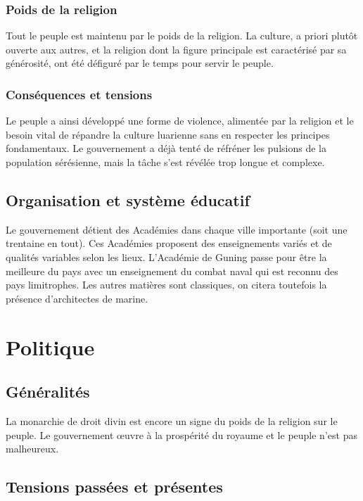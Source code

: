 \documentclass[french, a4paper, 12pt]{article}
\begin{document}
\subsubsection{Poids de la religion}

Tout le peuple est maintenu par le poids de la religion. La culture, a priori plutôt ouverte aux autres, et la religion dont la figure principale est caractérisé par sa générosité, ont été défiguré par le temps pour servir le peuple.

\subsubsection{Conséquences et tensions}

Le peuple a ainsi développé une forme de violence, alimentée par la religion et le besoin vital de répandre la culture luarienne sans en respecter les principes fondamentaux. Le gouvernement a déjà tenté de réfréner les pulsions de la population sérésienne, mais la tâche s'est révélée trop longue et complexe.

\subsection{Organisation et système éducatif}

Le gouvernement détient des Académies dans chaque ville importante (soit une trentaine en tout). Ces Académies proposent des enseignements variés et de qualités variables selon les lieux. L'Académie de Guning passe pour être la meilleure du pays avec un enseignement du combat naval qui est reconnu des pays limitrophes. Les autres matières sont classiques, on citera toutefois la présence d'architectes de marine.

\section{Politique}

\subsection{Généralités}

La monarchie de droit divin est encore un signe du poids de la religion sur le peuple. Le gouvernement œuvre à la prospérité du royaume et le peuple n'est pas malheureux.

\subsection{Tensions passées et présentes}
\end{document}
